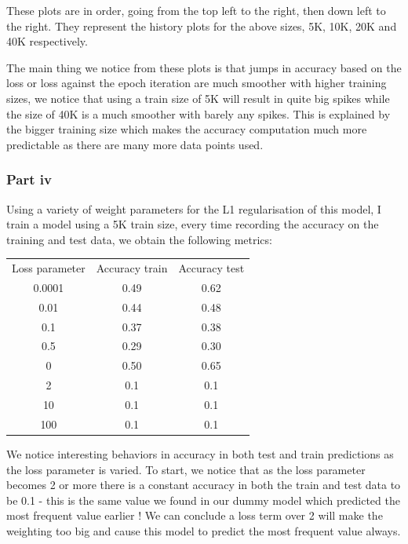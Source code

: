 \documentclass[10pt]{article}
\begin{document}
These plots are in order, going from the top left to the right, then down left to the right.
They represent the history plots for the above sizes, 5K, 10K, 20K and 40K respectively.

The main thing we notice from these plots is that jumps in accuracy based on the loss
or loss against the epoch iteration are much smoother with higher training sizes, we notice
that using a train size of 5K will result in quite big spikes while the size of 40K
is a much smoother with barely any spikes. This is explained by the bigger
training size which makes the accuracy computation much more predictable as there are many more data points used. 

\subsubsection*{Part iv}
Using a variety of weight parameters for the L1 regularisation of this model, I train a model using a 5K train size, every time
recording the accuracy on the training and test data, we obtain the following metrics:

\vspace{5mm} %
\begin{center} \begin{tabular}[h]{ccc}
    Loss parameter & Accuracy train & Accuracy test  \\
    0.0001 & 0.49           & 0.62            \\
    0.01   & 0.44           & 0.48            \\
    0.1    & 0.37           & 0.38            \\   
    0.5    & 0.29           & 0.30            \\
    0      & 0.50           & 0.65            \\
    2      & 0.1            & 0.1             \\
    10     & 0.1            & 0.1             \\
    100    & 0.1            & 0.1             \\
\end{tabular} \end{center}

We notice interesting behaviors in accuracy in both test and train predictions
as the loss parameter is varied.
To start, we notice that as the loss parameter becomes 2 or more there is a constant
accuracy in both the train and test data to be 0.1 - this is the same value we found in our
dummy model which predicted the most frequent value earlier ! We can conclude a loss term over
2 will make the weighting too big and cause this model to predict the most frequent value always.
\end{document}
